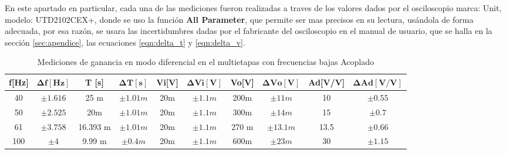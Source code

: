 \begin{enumerate}
        En este apartado en particular, cada una de las mediciones fueron realizadas a traves de los valores dados por el osciloscopio marca: Unit, modelo: UTD2102CEX+, donde se uso la función \textbf{All Parameter}, que permite ser mas precisos en su lectura, usándola de forma adecuada, por esa razón, se usara las incertidumbres dadas por el fabricante del osciloscopio en el manual de usuario, que se halla en la sección \ref{sec:apendice}, las ecuaciones \ref{eqn:delta_t} y \ref{eqn:delta_v}.


        \begin{table}[H]
          \centering
          \begin{tabular}{|c|c|c|c|c|c|c|c|c|c|}
            \hline
            \textbf{f[Hz]} & $\mathbf{\Delta f [Hz]}$ & \textbf{T [s]} & $\mathbf{\Delta T [s]}$ & \textbf{Vi[V]} & $\mathbf{\Delta Vi[V]}$ & \textbf{Vo[V]} & $\mathbf{\Delta Vo[V]}$ & \textbf{Ad[V/V]} & $\mathbf{\Delta Ad[V/V]}$ \\
            \hline
            40             & $\pm1.616$               & 25 m           & $\pm 1.01m$             & 20m            & $\pm 1.1m$              & 200m           & $\pm 11m$               & 10               & $\pm 0.55$                \\
            \hline
            50             & $\pm 2.525$              & 20m            & $\pm 1.01m$             & 20m            & $\pm 1.1m$              & 300m           & $\pm 14m$               & 15               & $\pm 0.7$                 \\
            \hline
            61             & $\pm 3.758$              & 16.393 m       & $\pm 1.01m$             & 20m            & $\pm 1.1m$              & 270 m          & $\pm 13.1m$             & 13.5             & $\pm 0.66$                \\
            \hline
            100            & $\pm 4$                  & 9.99 m         & $\pm 0.4 m$             & 20m            & $\pm 1.1m$              & 600m           & $\pm 23m$               & 30               & $\pm 1.15$                \\
            \hline
          \end{tabular}
          \caption{Mediciones de ganancia en modo diferencial en el multietapas con frecuencias bajas Acoplado}
          \label{tab:ganancia_frecuencias_bajas}
        \end{table}



\end{enumerate}
